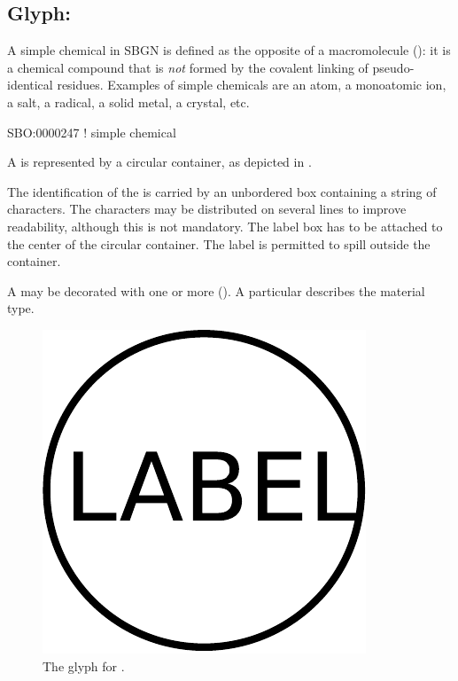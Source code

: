 
\color{red}

\subsection{Glyph: }
\label{sec:simpleChemical}

A simple chemical in SBGN \ER is defined as the opposite of a macromolecule (): it is a chemical compound that is \emph{not} formed by the covalent linking of pseudo-identical residues.  Examples of simple chemicals are an atom, a monoatomic ion, a salt, a radical, a solid metal, a crystal, etc.

\begin{glyphDescription}

\glyphSboTerm SBO:0000247 ! simple chemical

\glyphContainer A  is represented by a circular container, as depicted in .

\glyphLabel The identification of the  is carried by an unbordered box containing a string of characters.  The characters may be distributed on several lines to improve readability, although this is not mandatory.  The label box has to be attached to the center of the circular container.  The label is permitted to spill outside the container.

\glyphAux A  may be decorated with one or more  ().  A particular  describes the material type.

\end{glyphDescription}

\begin{figure}[H]
  \centering
  \includegraphics[scale = 0.3]{images/simpleChemical}
  \caption{The \ER glyph for .}
  \label{fig:simpleChemical}
\end{figure}

\normalcolor

